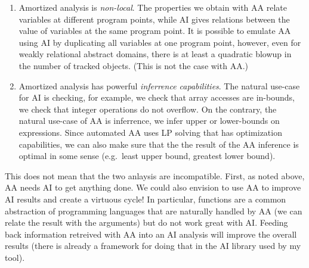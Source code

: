 \documentclass[nocopyrightspace,preprint]{sigplanconf-pldi15}
\begin{document}
\begin{enumerate}

\item Amortized analysis is \emph{non-local}. The properties
we obtain with AA relate variables at different program points,
while AI gives relations between the value of variables at the
same program point.  It is possible to emulate AA using AI by
duplicating all variables at one program point, however, even
for weakly relational abstract domains, there is at least a
quadratic blowup in the number of tracked objects.  (This is
not the case with AA.)

\item Amortized analysis has powerful \emph{inferrence
capabilities}.  The natural use-case for AI is checking, for
example, we check that array accesses are in-bounds, we check
that integer operations do not overflow.  On the contrary,
the natural use-case of AA is inferrence, we infer upper or
lower-bounds on expressions.  Since automated AA uses LP
solving that has optimization capabilities, we can also make
sure that the the result of the AA inference is optimal in
some sense (e.g.\ least upper bound, greatest lower bound).

\end{enumerate}

This does not mean that the two anlaysis are incompatible.
First, as noted above, AA needs AI to get anything done.  We could
also envision to use AA to improve AI results and create a
virtuous cycle!  In particular, functions are a common abstraction
of programming languages that are naturally handled by AA (we
can relate the result with the arguments) but do not work great
with AI.  Feeding back information retreived with AA into an AI
analysis will improve the overall results (there is already a
framework for doing that in the AI library used by my tool).
\end{document}
